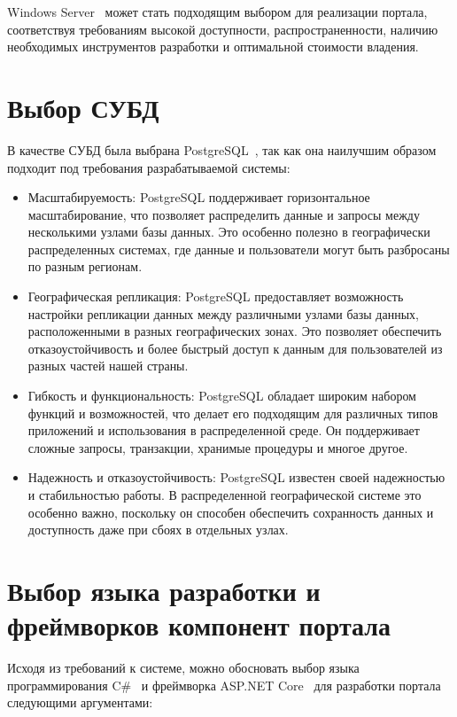 Windows Server~\cite{windows-server} может стать подходящим выбором для реализации портала, соответствуя требованиям высокой доступности, распространенности, наличию необходимых инструментов разработки и оптимальной стоимости владения.

\section{Выбор СУБД}

В качестве СУБД была выбрана PostgreSQL~\cite{postgresql}, так как она наилучшим образом подходит под требования разрабатываемой системы:

\begin{itemize}
	\item Масштабируемость: PostgreSQL поддерживает горизонтальное масштабирование, что позволяет распределить данные и запросы между несколькими узлами базы данных. Это особенно полезно в географически распределенных системах, где данные и пользователи могут быть разбросаны по разным регионам.
	
	\item Географическая репликация: PostgreSQL предоставляет возможность настройки репликации данных между различными узлами базы данных, расположенными в разных географических зонах. Это позволяет обеспечить отказоустойчивость и более быстрый доступ к данным для пользователей из разных частей нашей страны.
	
	\item Гибкость и функциональность: PostgreSQL обладает широким набором функций и возможностей, что делает его подходящим для различных типов приложений и использования в распределенной среде. Он поддерживает сложные запросы, транзакции, хранимые процедуры и многое другое.
	
	\item Надежность и отказоустойчивость: PostgreSQL известен своей надежностью и стабильностью работы. В распределенной географической системе это особенно важно, поскольку он способен обеспечить сохранность данных и доступность даже при сбоях в отдельных узлах.
\end{itemize}

\section{Выбор языка разработки и фреймворков компонент портала}

Исходя из требований к системе, можно обосновать выбор языка программирования C\#~\cite{csharp} и фреймворка ASP.NET Core~\cite{aspnet} для разработки портала следующими аргументами:

